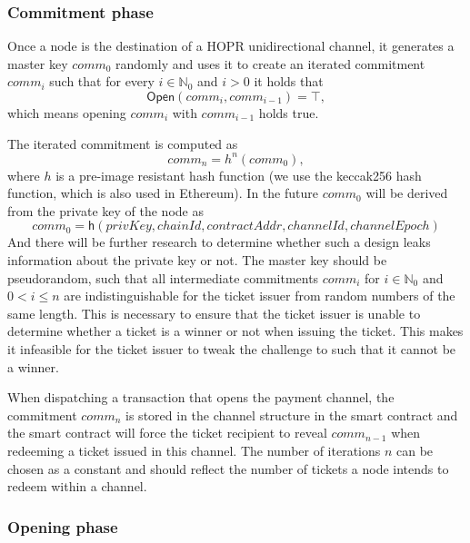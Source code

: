\subsubsection{Commitment phase}

Once a node is the destination of a HOPR unidirectional channel, it generates a master key $comm_0$ randomly and uses it to create an iterated
commitment $comm_i$ such that for every $i \in \mathbb{N}_0$ and $i > 0$ it
holds that $$ \mathsf{Open}(comm_{i}, comm_{i-1}) = \top,$$ which means opening
$comm_{i}$ with $comm_{i-1}$ holds true.

The iterated commitment is computed as $$comm_n = h^n(comm_0),$$ where $h$ is a
pre-image resistant hash function (we use the keccak256 hash function, which is also used
in Ethereum). In the future $comm_0$ will be derived from the private key of the node as $$ comm_0 = \mathsf{h}(privKey,chainId,
contractAddr, channelId, channelEpoch)$$
And there will be further research to determine whether such a design leaks information about the
private key or not. 
The master key should be pseudorandom, such that
all intermediate commitments $comm_{i}$ for $i \in \mathbb{N}_0$ and $0 < i \le
n$ are indistinguishable for the ticket issuer from random numbers of the same
length. This is necessary to ensure that the ticket issuer is unable to
determine whether a ticket is a winner or not when issuing the ticket. This makes
it infeasible for the ticket issuer to tweak the challenge to such that it
cannot be a winner.

When dispatching a transaction that opens the payment channel, the
commitment $comm_n$ is stored in the channel structure in the smart contract and
the smart contract will force the ticket recipient to reveal $comm_{n-1}$ when
redeeming a ticket issued in this channel. The number of iterations $n$ can be
chosen as a constant and should reflect the number of tickets a node intends to
redeem within a channel.

\subsubsection{Opening phase}

